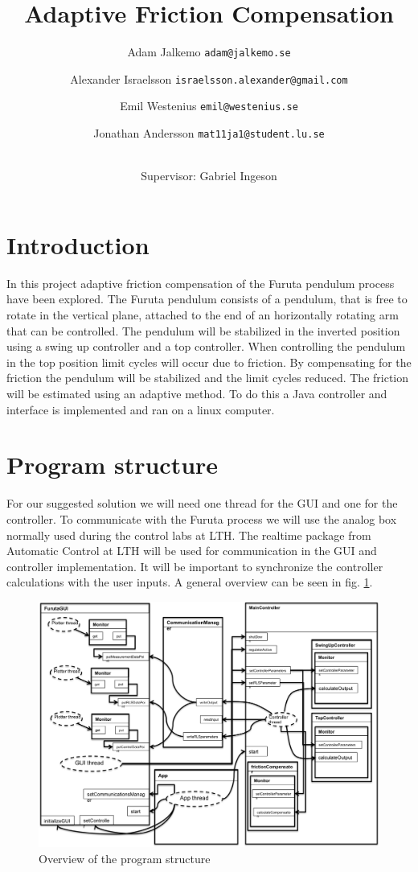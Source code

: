 \documentclass[10pt,a4paper]{article}
\author{Adam Jalkemo \texttt{adam@jalkemo.se} \and
Alexander Israelsson \texttt{israelsson.alexander@gmail.com} \and
Emil Westenius \texttt{emil@westenius.se} \and
Jonathan Andersson \texttt{mat11ja1@student.lu.se}
\and 
\\
Supervisor: Gabriel Ingeson}
\begin{document}
\title{Adaptive Friction Compensation}

\maketitle
\pagebreak
\section{Introduction}
In this project adaptive friction compensation of the Furuta pendulum process have been explored. The Furuta pendulum consists of a pendulum, that is free to rotate in the vertical plane, attached to the end of an horizontally rotating arm that can be controlled. The pendulum will be stabilized in the inverted position using a swing up controller and a top controller. When controlling the pendulum in the top position limit cycles will occur due to friction. By compensating for the friction the pendulum will be stabilized and the limit cycles reduced. The friction will be estimated using an adaptive method. To do this a Java controller and interface is implemented and ran on a linux computer.
\section{Program structure}
For our suggested solution we will need one thread for the GUI and one for the controller. To communicate with the Furuta process we will use the analog box normally used during the control labs at LTH. The realtime package from Automatic Control at LTH will be used for communication in the GUI and controller implementation. It will be important to synchronize the controller calculations with the user inputs. A general overview can be seen in fig. \ref{fig:uml}.

\begin{figure}[!htb]
\centering
\includegraphics[width=1\textwidth]{notUml.png}
\caption{Overview of the program structure}
\label{fig:uml}
\end{figure}
\end{document}
